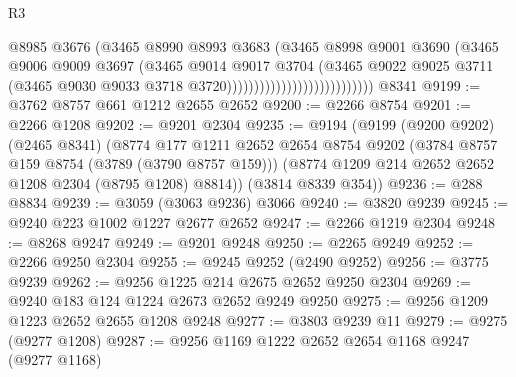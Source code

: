 \begin{lexlean}{R3}
\begin{coremodule}
                                              @8985
                                              @3676
                                              (@3465
                                                @8990
                                                @8993
                                                @3683
                                                (@3465
                                                  @8998
                                                  @9001
                                                  @3690
                                                  (@3465
                                                    @9006
                                                    @9009
                                                    @3697
                                                    (@3465
                                                      @9014
                                                      @9017
                                                      @3704
                                                      (@3465
                                                        @9022
                                                        @9025
                                                        @3711
                                                        (@3465
                                                          @9030
                                                          @9033
                                                          @3718
                                                          @3720)))))))))))))))))))))))))))
    @8341
@9199 := @3762 @8757 @661 @1212 @2655 @2652
@9200 := @2266 @8754
@9201 := @2266 @1208
@9202 := @9201 @2304
@9235 := @9194
    (@9199
      (@9200 @9202)
      (@2465 @8341)
      (@8774
        @177
        @1211
        @2652
        @2654
        @8754
        @9202
        (@3784 @8757 @159 @8754 (@3789 (@3790 @8757 @159)))
        (@8774 @1209 @214 @2652 @2652 @1208 @2304 (@8795 @1208) @8814))
      (@3814 @8339 @354))
@9236 := @288 @8834
@9239 := @3059 (@3063 @9236) @3066
@9240 := @3820 @9239
@9245 := @9240 @223 @1002 @1227 @2677 @2652
@9247 := @2266 @1219 @2304
@9248 := @8268 @9247
@9249 := @9201 @9248
@9250 := @2265 @9249
@9252 := @2266 @9250 @2304
@9255 := @9245 @9252 (@2490 @9252)
@9256 := @3775 @9239
@9262 := @9256 @1225 @214 @2675 @2652 @9250 @2304
@9269 := @9240 @183 @124 @1224 @2673 @2652 @9249 @9250
@9275 := @9256 @1209 @1223 @2652 @2655 @1208 @9248
@9277 := @3803 @9239 @11
@9279 := @9275 (@9277 @1208)
@9287 := @9256 @1169 @1222 @2652 @2654 @1168 @9247 (@9277 @1168)

\end{coremodule}
\end{lexlean}
